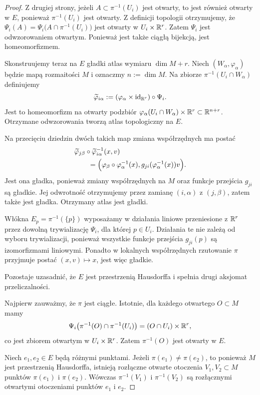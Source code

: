 \begin{proof}
Z drugiej strony, jeżeli
$A\subset\pi^{-1}(U_i)$ jest otwarty, to jest również
otwarty w $E$, ponieważ $\pi^{-1}(U_i)$ jest otwarty.
Z definicji topologii otrzymujemy, że $\Psi_i(A) =\Psi_i\bigl(A\cap\pi^{-1}(U_i)\bigr)$
jest otwarty w $U_i\times\mathbb{R}^r$.
Zatem $\Psi_i$ jest odwzorowaniem otwartym.
Ponieważ jest także ciągłą bijekcją, jest homeomorfizmem.

Skonstruujemy teraz na $E$ gładki atlas wymiaru
$\dim M+r$. Niech $(W_\alpha,\varphi_\alpha)$ będzie
mapą rozmaitości $M$ i oznaczmy $n:=\dim M$.
Na zbiorze $\pi^{-1}(U_i\cap W_\alpha)$ definiujemy
\[
\widetilde\varphi_{i\alpha}
:=
(\varphi_\alpha\times\operatorname{id}_{\mathbb{R}^r})
\circ\Psi_i.
\]
Jest to homeomorfizm na otwarty podzbiór $\varphi_\alpha(U_i\cap W_\alpha)\times\mathbb{R}^r \subset\mathbb{R}^{n+r}$.
Otrzymane odwzorowania tworzą atlas topologiczny na $E$.

Na przecięciu dziedzin dwóch takich map
zmiana współrzędnych ma postać
\[
\begin{aligned}
&\widetilde\varphi_{j\beta}
\circ\widetilde\varphi_{i\alpha}^{-1}(x,v)\\
&\qquad =
\Bigl(
\varphi_\beta\circ\varphi_\alpha^{-1}(x),
g_{ji}(\varphi_\alpha^{-1}(x))v
\Bigr).
\end{aligned}
\]
Jest ona gładka, ponieważ zmiany współrzędnych na
$M$ oraz funkcje przejścia $g_{ji}$ są gładkie.
Jej odwrotność otrzymujemy przez zamianę
$(i,\alpha)$ z $(j,\beta)$, zatem także jest gładka.
Otrzymany atlas jest gładki.

Włókna $E_p=\pi^{-1}(\{p\})$ wyposażamy w działania
liniowe przeniesione z $\mathbb{R}^r$ przez dowolną
trywializację $\Psi_i$, dla której $p\in U_i$.
Działania te nie zależą od wyboru trywializacji,
ponieważ wszystkie funkcje przejścia $g_{ji}(p)$
są izomorfizmami liniowymi.
Ponadto w lokalnych współrzędnych rzutowanie
$\pi$ przyjmuje postać $(x,v)\longmapsto x$,
jest więc gładkie.

Pozostaje uzasadnić, że $E$ jest przestrzenią
Hausdorffa i spełnia drugi aksjomat przeliczalności.

Najpierw zauważmy, że $\pi$ jest ciągłe.
Istotnie, dla każdego otwartego $O\subset M$ mamy
\[
\Psi_i\bigl(
\pi^{-1}(O)\cap\pi^{-1}(U_i)
\bigr)
=(O\cap U_i)\times\mathbb{R}^r,
\]
co jest zbiorem otwartym w $U_i\times\mathbb{R}^r$.
Zatem $\pi^{-1}(O)$ jest otwarty w $E$.

Niech $e_1,e_2\in E$ będą różnymi punktami.
Jeżeli $\pi(e_1)\ne\pi(e_2)$, to ponieważ $M$
jest przestrzenią Hausdorffa, istnieją rozłączne
otwarte otoczenia $V_1,V_2\subset M$ punktów
$\pi(e_1)$ i $\pi(e_2)$. Wówczas
$\pi^{-1}(V_1)$ i $\pi^{-1}(V_2)$ są rozłącznymi
otwartymi otoczeniami punktów $e_1$ i $e_2$.


\end{proof}
